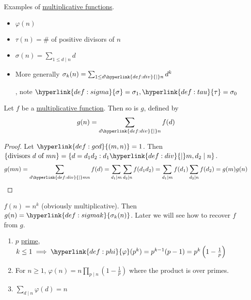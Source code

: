 \documentclass{article}
\begin{document}
\begin{eg}
    Examples of \hyperlink{def:multiplicativeFunction}{multiplicative functions}.
    \begin{itemize}
        \item $\varphi(n)$
        \item \hypertarget{def:tau}{$\tau (n) = \#$ of positive divisors of $n$}
        \item \hypertarget{def:sigma}{$\sigma (n) = \sum_{1 \leq d \mid n} d$}
        \item\hypertarget{def:sigmak}{More generally $\sigma_k (n) = \sum_{1 \leq d \hyperlink{def:div}{\mid} n} d^k$}, note $\hyperlink{def:sigma}{\sigma} = \sigma_1, \hyperlink{def:tau}{\tau} = \sigma_0$
    \end{itemize}
\end{eg}

\begin{nlemma}\label{lem:2.4}
    Let $f$ be a \hyperlink{def:multiplicativeFunction}{multiplicative function}.
    Then so is $g$, defined by \begin{equation*} g(n) = \sum_{d \hyperlink{def:div}{\mid} n} f(d) \end{equation*}
\end{nlemma}

\begin{proof}
    Let $\hyperlink{def:gcd}{(m, n)} = 1$.
    Then $\{\text{divisors }d\text{ of }mn\} = \{ d = d_1 d_2 : d_1 \hyperlink{def:div}{\mid} m, d_2 \mid n \}$.
    \begin{equation*}
        g(mn) = \sum_{d \hyperlink{def:div}{\mid} mn} f(d) = \sum_{d_1 \mid m} \sum_{d_2 \mid n} f(d_1 d_2) = \sum_{d_1 \mid m} f(d_1) \sum_{d_2 \mid n} f(d_2) = g(m)g(n) \qedhere
    \end{equation*}
\end{proof}

\begin{eg}
    $f(n) = n^k$ (obviously multiplicative). Then $g(n) = \hyperlink{def:sigmak}{\sigma_k(n)}$.
    Later we will see how to recover $f$ from $g$.
\end{eg}


\begin{nthm}\label{thm:2.5}
    \leavevmode
    \begin{enumerate}[label=(\roman*)]
        \item $p$ \hyperlink{def:prime}{prime}, $k \leq 1 \implies \hyperlink{def:phi}{\varphi}(p^k) = p^{k-1} (p-1) = p^k \left(1-\frac{1}{p}\right)$
        \item For $n \geq 1$, $\varphi (n) = n \prod_{p \mid n}\left( 1-\frac{1}{p} \right)$ where the product is over primes.
        \item $\sum_{d \mid n} \varphi(d) = n$
    \end{enumerate}
\end{nthm}
\end{document}
